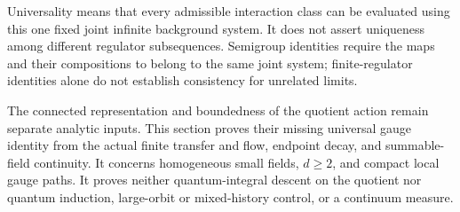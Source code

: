 Universality means that every admissible interaction class can be
evaluated using this one fixed joint infinite background system.
It does not assert uniqueness among different regulator subsequences.
Semigroup identities require the maps and their compositions to
belong to the same joint system; finite-regulator identities alone
do not establish consistency for unrelated limits.

The connected representation and boundedness of the quotient action
remain separate analytic inputs. This section proves their missing
universal gauge identity from the actual finite transfer and flow,
endpoint decay, and summable-field continuity. It concerns homogeneous
small fields, $d\ge2$, and compact local gauge paths. It proves neither
quantum-integral descent on the quotient nor quantum induction,
large-orbit or mixed-history control, or a continuum measure.
